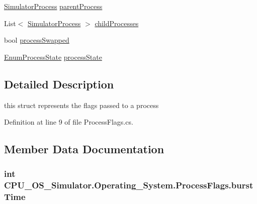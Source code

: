 \begin{DoxyCompactItemize}
\item 
\hyperlink{class_c_p_u___o_s___simulator_1_1_operating___system_1_1_simulator_process}{Simulator\+Process} \hyperlink{struct_c_p_u___o_s___simulator_1_1_operating___system_1_1_process_flags_a6b32c9b5ed4914dede86c2a1306c897e}{parent\+Process}
\item 
List$<$ \hyperlink{class_c_p_u___o_s___simulator_1_1_operating___system_1_1_simulator_process}{Simulator\+Process} $>$ \hyperlink{struct_c_p_u___o_s___simulator_1_1_operating___system_1_1_process_flags_aae4b90a688d3ac4e6d3faea6cb275242}{child\+Processes}
\item 
bool \hyperlink{struct_c_p_u___o_s___simulator_1_1_operating___system_1_1_process_flags_aa57e25afb816fa9a0e11c43920640992}{process\+Swapped}
\item 
\hyperlink{namespace_c_p_u___o_s___simulator_1_1_operating___system_a836ee2204e78fcb3a7dd6c3c942b1a24}{Enum\+Process\+State} \hyperlink{struct_c_p_u___o_s___simulator_1_1_operating___system_1_1_process_flags_ac5d7a47d263eb80357b0a7900858bd98}{process\+State}
\end{DoxyCompactItemize}


\subsection{Detailed Description}
this struct represents the flags passed to a process 



Definition at line 9 of file Process\+Flags.\+cs.



\subsection{Member Data Documentation}
\hypertarget{struct_c_p_u___o_s___simulator_1_1_operating___system_1_1_process_flags_ac0e98ee86de3c22c7a022e3dcd69935f}{}
\subsubsection[{burst\+Time}]{\setlength{\rightskip}{0pt plus 5cm}int C\+P\+U\+\_\+\+O\+S\+\_\+\+Simulator.\+Operating\+\_\+\+System.\+Process\+Flags.\+burst\+Time}\label{struct_c_p_u___o_s___simulator_1_1_operating___system_1_1_process_flags_ac0e98ee86de3c22c7a022e3dcd69935f}


